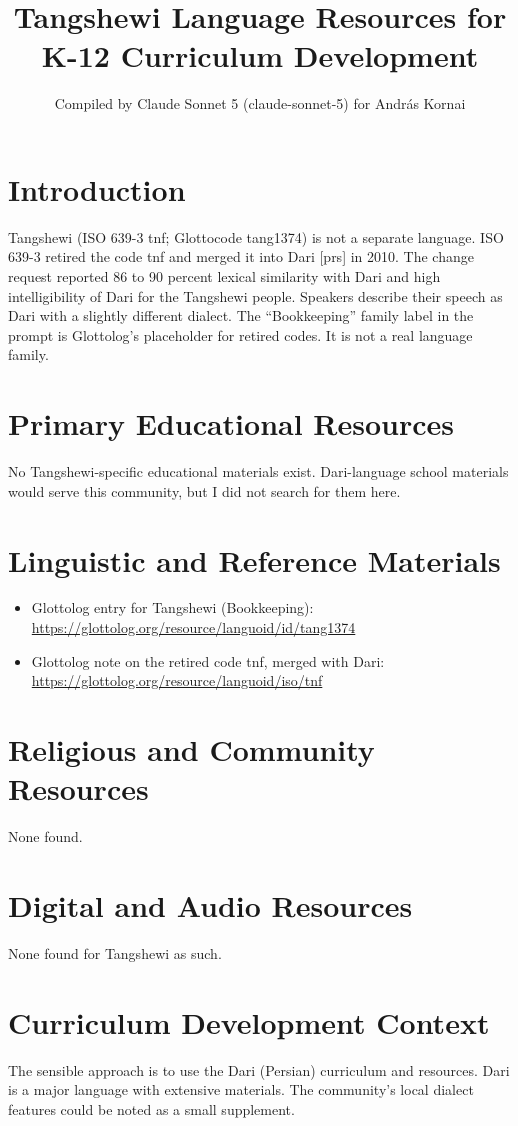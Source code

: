 \documentclass[12pt]{article}
\title{Tangshewi Language Resources for K-12 Curriculum Development}
\author{Compiled by Claude Sonnet 5 (claude-sonnet-5) for Andr\'as Kornai}
\date{}
\begin{document}
\maketitle

\section{Introduction}
Tangshewi (ISO 639-3 tnf; Glottocode tang1374) is not a separate language. ISO 639-3 retired the code tnf and merged it into Dari [prs] in 2010. The change request reported 86 to 90 percent lexical similarity with Dari and high intelligibility of Dari for the Tangshewi people. Speakers describe their speech as Dari with a slightly different dialect. The ``Bookkeeping'' family label in the prompt is Glottolog's placeholder for retired codes. It is not a real language family.

\section{Primary Educational Resources}
No Tangshewi-specific educational materials exist. Dari-language school materials would serve this community, but I did not search for them here.

\section{Linguistic and Reference Materials}
\begin{itemize}
\item Glottolog entry for Tangshewi (Bookkeeping): \url{https://glottolog.org/resource/languoid/id/tang1374}
\item Glottolog note on the retired code tnf, merged with Dari: \url{https://glottolog.org/resource/languoid/iso/tnf}
\end{itemize}

\section{Religious and Community Resources}
None found.

\section{Digital and Audio Resources}
None found for Tangshewi as such.

\section{Curriculum Development Context}
The sensible approach is to use the Dari (Persian) curriculum and resources. Dari is a major language with extensive materials. The community's local dialect features could be noted as a small supplement.
\end{document}
